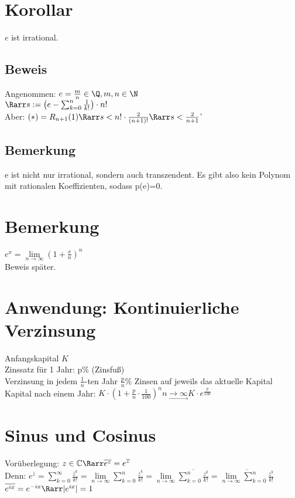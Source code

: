\section{Korollar}
$e$ ist irrational.
\subsection*{Beweis}
Angenommen: $e= \frac{m}{n}\in \Q, m,n \in \N$\\
$\Rarr s:= \left(e-\sum_{k=0}^{n} \frac{1}{k!}\right) \cdot n!$\\
Aber: $(*) = R_{n+1}(1) \Rarr s < n! \cdot \frac{2}{(n+1)!} \Rarr s< \frac{2}{n+1} \lightning$
\subsection*{Bemerkung}
e ist nicht nur irrational, sondern auch transzendent. Es gibt also kein Polynom mit rationalen Koeffizienten, sodass p(e)=0.
\section{Bemerkung}
$e^x = \lim\limits_{n\to ∞} \left( 1 + \frac{x}{n} \right)^n$\\
Beweis später.
\section*{Anwendung: Kontinuierliche Verzinsung}
Anfangskapital $K$\\
Zinssatz für 1 Jahr: p\% (Zinsfuß)\\
Verzinsung in jedem $\frac{1}{n}$-ten Jahr $\frac{p}{n}$\% Zinsen auf jeweils das aktuelle Kapital\\
Kapital nach einem Jahr: $K \cdot \left( 1 + \frac{p}{n} \cdot \frac{1}{100} \right)^n \underset{\longrightarrow}{n\to ∞} K \cdot e^{\frac{p}{100}}$
\section*{Sinus und Cosinus}
Vorüberlegung: $z\in \C \Rarr \overline{e^z} = e^{\overline{z}}$\\
Denn: $e^{\overline{z}} = \sum_{k=0}^{∞} \frac{\overline{z}^k}{k!} = \lim\limits_{n\to ∞} \sum_{k=0}^{n} \frac{\overline{z}^k}{k!} = \lim\limits_{n\to ∞} \overline{\sum_{k=0}^{n}\frac{z^k}{k!}} = \overline{\lim\limits_{n\to ∞} \sum_{k=0}^{n}\frac{z^k}{k!}}$
$\overline{e^{ix}} = e^{-ix} \Rarr |e^{ix}| = 1$\\

